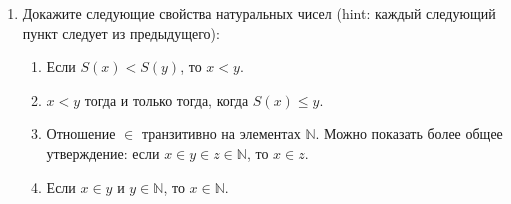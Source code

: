 \begin{enumerate}
\item Докажите следующие свойства натуральных чисел (hint: каждый следующий пункт следует из предыдущего):
\begin{enumerate}
\item Если $S(x) < S(y)$, то $x < y$.
\item $x < y$ тогда и только тогда, когда $S(x) \leq y$.
\item Отношение $\in$ транзитивно на элементах $\mathbb{N}$.
    Можно показать более общее утверждение: если $x \in y \in z \in \mathbb{N}$, то $x \in z$.
\item Если $x \in y$ и $y \in \mathbb{N}$, то $x \in \mathbb{N}$.
\end{enumerate}

\end{enumerate}

